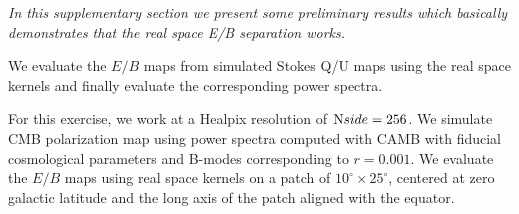 \documentclass[12pt]{article}
\begin{document}
\textit{In this supplementary section we present some preliminary results which basically demonstrates that the real space E/B separation works.} 

We evaluate the $E/B$ maps from simulated Stokes Q/U maps using the real space kernels and finally evaluate the corresponding power spectra. 
%
\begin{figure}[h]
\centering
{}
\caption{}
\end{figure}
%
For this exercise, we work at a Healpix resolution of ${\textrm Nside}=256$. We simulate CMB polarization map using power spectra computed with CAMB with fiducial cosmological parameters and B-modes corresponding to $r=0.001$. We evaluate the $E/B$ maps using real space kernels on a patch of $10 ^{\circ} \times 25^{\circ}$, centered at zero galactic latitude and the long axis of the patch aligned with the equator. 
%
\end{document}
